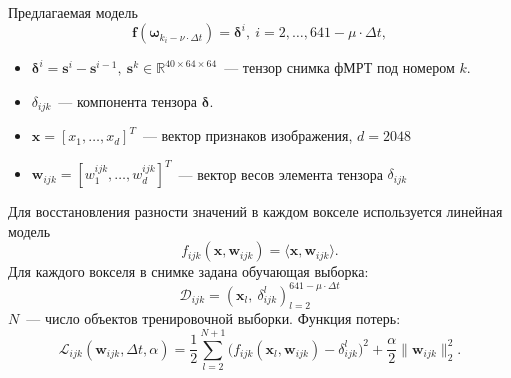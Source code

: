 \documentclass[9pt,pdf]{beamer} %
\begin{document}
\begin{frame}{Предлагаемая модель}
\begin{equation*}
	\label{main_model}
	\bm{f}(\bm{\omega}_{k_i - \nu \cdot \Delta t}) = \bm{\delta}^i, \ i = 2, \ldots, 641-\mu \cdot \Delta t,
\end{equation*}
\begin{itemize}
    \item $\bm{\delta}^i = \bm{s}^i - \bm{s}^{i-1},~\bm{s}^k \in \mathbb{R}^{40 \times 64 \times 64}$~--- тензор снимка фМРТ под номером $k$.
    \item $\delta_{ijk}$~--- компонента тензора $\bm{\delta}$.
    \item $\bm{x} = [x_1, \ldots, x_{d}]^{T}$~--- вектор признаков изображения, $d=2048$ 
    \item $\bm{w}_{ijk} = [w^{ijk}_1, \ldots, w^{ijk}_{d}]^{T}$~--- вектор весов элемента тензора $\delta_{ijk}$
\end{itemize}
    Для восстановления разности значений в каждом вокселе используется линейная модель
\begin{equation*}
	\label{f_ijk}
	f_{ijk}(\bm{x}, \bm{w}_{ijk}) = \langle \bm{x}, \bm{w}_{ijk} \rangle.
 \end{equation*}
 Для каждого вокселя в снимке задана обучающая выборка:
\begin{equation*}
    \mathcal{D}_{ijk} = \left(\bm{x}_l,~\delta^{l}_{ijk} \right)^{641 - \mu \cdot \Delta t}_{l = 2}
\end{equation*}
$N$~--- число объектов тренировочной выборки. Функция потерь:
\begin{equation*}
	\label{Loss}
	\mathcal{L}_{ijk}(\bm{w}_{ijk}, \Delta t, \alpha) = \frac{1}{2} \sum\limits_{l = 2}^{N+1} \big(f_{ijk}(\bm{x}_l, \bm{w}_{ijk}) - \delta^{l}_{ijk}\big)^2 + \frac{\alpha}{2} \|\bm{w}_{ijk}\|^2_2.
\end{equation*}
\end{frame}
\end{document}
